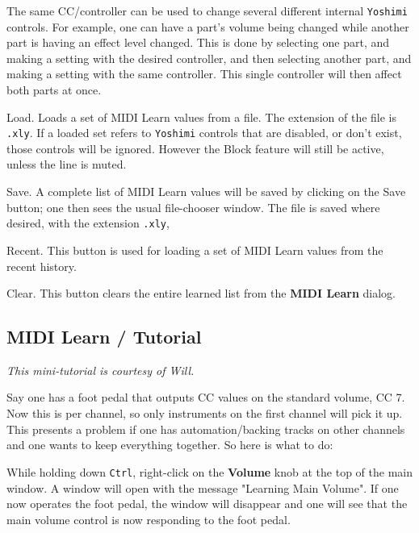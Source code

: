    The same CC/controller can be used to change several different internal
   \texttt{Yoshimi} controls.  For example, one can have a part's volume being
   changed while another part is having an effect level changed.
   This is done by selecting one part, and making a setting with the desired
   controller, and then selecting another part, and making a setting with the
   same controller.
   This single controller will then affect both parts at once.

   Load.
   Loads a set of MIDI Learn values from a file.
   The extension of the file is \texttt{.xly}.
   If a loaded set refers to \texttt{Yoshimi}
   controls that are disabled, or don't exist, those controls will be ignored.
   However the Block feature will still be active, unless the line is muted.

   Save.
   A complete list of MIDI Learn values
   will be saved by clicking on the Save button; one then sees
   the usual file-chooser window.
   The file is saved where desired, with the extension \texttt{.xly},

   Recent.
   This button is used for loading a set of
   MIDI Learn values from the recent history.

   Clear.
   This button clears the entire learned list from the
   \textbf{MIDI Learn} dialog.


\subsection{MIDI Learn / Tutorial}
\label{subsec:midi_learn_tutorial}

   \textsl{This mini-tutorial is courtesy of Will.}

   Say one has a foot pedal that outputs CC values on the standard volume, CC 7.
   Now this is per channel, so only instruments on the first channel will pick
   it up.  This presents a problem if one has automation/backing tracks on
   other channels and one wants to keep everything together. So here is what to
   do:

   While holding down \texttt{Ctrl}, right-click on the
   \textbf{Volume} knob at the top of the
   main window. A window will open with the message "Learning Main Volume".
   If one now operates the foot pedal, the window will disappear and one will
   see that the main volume control is now responding to the foot pedal.


